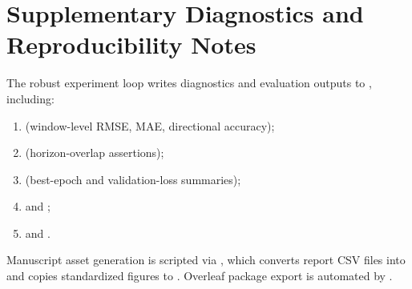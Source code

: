 \section{Supplementary Diagnostics and Reproducibility Notes}

The robust experiment loop writes diagnostics and evaluation outputs to , including:
\begin{enumerate}
  \item {} (window-level RMSE, MAE, directional accuracy);
  \item {} (horizon-overlap assertions);
  \item {} (best-epoch and validation-loss summaries);
  \item {} and ;
  \item {} and .
\end{enumerate}

Manuscript asset generation is scripted via , which converts report CSV files into  and copies standardized figures to . Overleaf package export is automated by .
